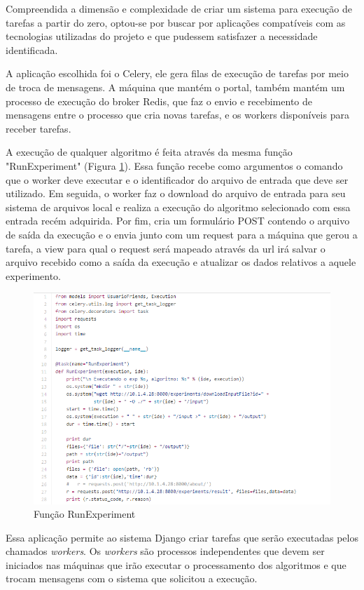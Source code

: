 \documentclass[tg]{mdtufsm}
\begin{document}
Compreendida a dimensão e complexidade de criar um sistema para execução de tarefas a partir do zero, optou-se por buscar por aplicações compatíveis com as tecnologias utilizadas do projeto e que pudessem satisfazer a necessidade identificada.

A aplicação escolhida foi o Celery, ele gera filas de execução de tarefas por meio de troca de mensagens. A máquina que mantém o portal, também mantém um processo de execução do broker Redis, que faz o envio e recebimento de mensagens entre o processo que cria novas tarefas, e os workers disponíveis para receber tarefas.

A execução de qualquer algoritmo é feita através da mesma função "RunExperiment" (Figura \ref{fig:run}). Essa função recebe como argumentos o comando que o worker deve executar e o identificador do arquivo de entrada que deve ser utilizado. Em seguida, o worker faz o download do arquivo de entrada para seu sistema de arquivos local e realiza a execução do algoritmo selecionado com essa entrada recém adquirida. Por fim, cria um formulário POST contendo o arquivo de saída da execução e o envia junto com um request para a máquina que gerou a tarefa, a view para qual o request será mapeado através da url irá salvar o arquivo recebido como a saída da execução e atualizar os dados relativos a aquele experimento.

\begin{figure}
	\centering
	\includegraphics[width=1\textwidth]{task}
	\caption{
		Função RunExperiment
	}
	\label{fig:run}
\end{figure}


Essa aplicação permite ao sistema Django criar tarefas que serão executadas pelos chamados \emph{workers}. Os \emph{workers} são processos independentes que devem ser iniciados nas máquinas que irão executar o processamento dos algoritmos e que trocam mensagens com o sistema que solicitou a execução.
\end{document}
